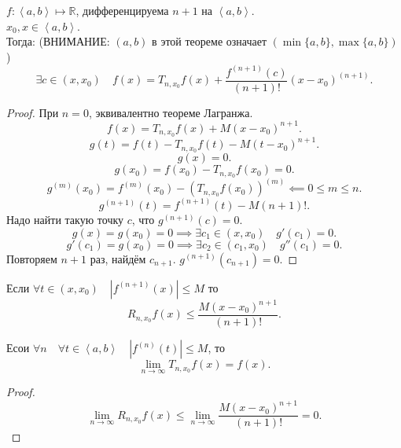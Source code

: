 \documentclass[11pt, oneside]{article}   	%
\begin{document}
    \begin{theorem}
        $f: \left<a, b\right> \mapsto \mathbb{R}$, дифференцируема $n+1$ на $\left<a,b\right>$.\\
        $x_0, x\in \left<a, b\right>$.\\
        Тогда:
        (ВНИМАНИЕ: $\left( a, b \right) $ в этой теореме означает $\left( \min \{a, b\}, \max \{a, b\}  \right) $)
        \[ \exists{c\in \left( x, x_0 \right) }\quad f(x) = T_{n, x_0}f(x) + \frac{f^{(n+1)}(c)}{(n+1)!}(x-x_0)^{(n+1)}  .\]
        \begin{proof}
            При $n=0$, эквивалентно теореме Лагранжа.\\
            \[ f(x) = T_{n,x_0}f(x) + M(x-x_0)^{n+1} .\] 
            \[ g(t) = f(t) - T_{n, x_0}f(t) - M(t-x_0)^{n+1} .\] 
            \[ g(x) = 0 .\]
            \[ g(x_0) = f(x_0) - T_{n, x_0}f(x_0) = 0 .\]
            \[ g^{(m)}(x_0) = f^{(m)}(x_0) - \left( T_{n, x_0}f(x_0) \right)^{(m)} \impliedby 0 \le m \le n .\]
            \[ g^{(n+1)}(t) = f^{(n+1)}(t) - M(n+1)! .\]
            Надо найти такую точку $c$, что $g^{(n+1)}(c) = 0$.\\
            \[ g(x) = g(x_0) = 0 \implies \exists{c_1\in \left( x, x_0 \right) }\quad g'(c_1) = 0 .\]
            \[ g'(c_1) = g(x_0) = 0 \implies \exists{c_2\in \left( c_1, x_0 \right) }\quad g''(c_1) = 0 .\] 
            Повторяем $n+1$ раз, найдём $c_{n+1}$. $g^{(n+1)}(c_{n+1}) = 0$.
        \end{proof}
    \end{theorem}
    \begin{tlemma}
        Если $\forall{t\in (x, x_0)}\quad |f^{(n+1)}(x)| \le M$ то
        \[ R_{n, x_0}f(x) \le \frac{M(x-x_0)^{n+1}}{(n+1)!} .\] 
    \end{tlemma}
    \begin{tlemma}
        Есои $\forall{n}\quad \forall{t\in \left<a, b\right>}\quad |f^{(n)}(t)| \le M$, то
        \[ \lim\limits_{n \to \infty} T_{n, x_0}f(x) = f(x) .\]
        \begin{proof}
            \[ \lim\limits_{n \to \infty} R_{n, x_0}f(x) \le \lim\limits_{n \to \infty} \frac{M(x-x_0)^{n+1}}{(n+1)!} = 0 .\] 
        \end{proof}
    \end{tlemma}
\end{document}
